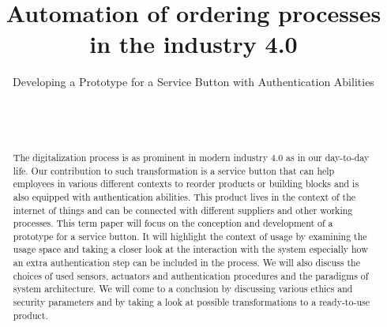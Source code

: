 \documentclass{sigchi}
\def\plaintitle{Automation of ordering processes in the industry 4.0}
\def\plainsubtitle{Developing a Prototype for a Service Button with Authentication Abilities}
\begin{document}
\title{\plaintitle}
\subtitle{\plainsubtitle}

\author{%
  \\
  \\
}



\maketitle
\begin{abstract}
    The digitalization process is as prominent in modern industry 4.0 as in our day-to-day life. Our contribution to such transformation is a service button that can help employees in various different contexts to reorder products or building blocks and is also equipped with authentication abilities. This product lives in the context of the internet of things and can be connected with different suppliers and other working processes. This term paper will focus on the conception and development of a prototype for a service button. It will highlight the context of usage by examining the usage space and taking a closer look at the interaction with the system especially how an extra authentication step can be included in the process. We will also discuss the choices of used sensors, actuators and authentication procedures and the paradigms of system architecture. We will come to a conclusion by discussing various ethics and security parameters and by taking a look at possible transformations to a ready-to-use product.
\end{abstract}
\end{document}
